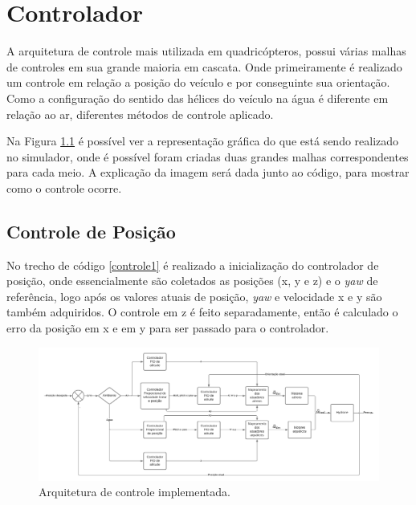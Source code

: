 \chapter{Controlador}

A arquitetura de controle mais utilizada em quadricópteros, possui várias malhas de controles em sua grande maioria em cascata. Onde primeiramente é realizado um controle em relação a posição do veículo e por conseguinte sua orientação. Como a configuração do sentido das hélices do veículo na água é diferente em relação ao ar, diferentes métodos de controle aplicado.

Na Figura \ref{fig:malhacontrole-01} é possível ver a representação gráfica do que está sendo realizado no simulador, onde é possível foram criadas duas grandes malhas correspondentes para cada meio. A explicação da imagem será dada junto ao código, para mostrar como o controle ocorre.

\section{Controle de Posição}

No trecho de código \ref{controle1} é realizado a inicialização do controlador de posição, onde essencialmente são coletados as posições (x, y e z) e o \textit{yaw} de referência, logo após os valores atuais de posição, \textit{yaw} e velocidade x e y são também adquiridos. O controle em z é feito separadamente, então é calculado o erro da posição em x e em y para ser passado para o controlador.




\begin{figure}[!htb]
    \centering
    \includegraphics[width=1.4\linewidth, angle =90]{imagens/Controle simulação.pdf}
    \caption{Arquitetura de controle implementada.}
    \label{fig:malhacontrole-01}
\end{figure}

